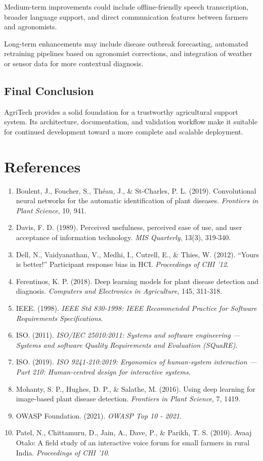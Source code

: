 \documentclass[12pt]{article}
\begin{document}
Medium-term improvements could include offline-friendly speech transcription, broader language support, and direct communication features between farmers and agronomists.

Long-term enhancements may include disease outbreak forecasting, automated retraining pipelines based on agronomist corrections, and integration of weather or sensor data for more contextual diagnosis.

\subsection{Final Conclusion}
AgriTech provides a solid foundation for a trustworthy agricultural support system. Its architecture, documentation, and validation workflow make it suitable for continued development toward a more complete and scalable deployment.

\newpage
\section*{References}

\begin{enumerate}
    \item Boulent, J., Foucher, S., Théau, J., \& St-Charles, P. L. (2019). Convolutional neural networks for the automatic identification of plant diseases. \textit{Frontiers in Plant Science}, 10, 941.
    \item Davis, F. D. (1989). Perceived usefulness, perceived ease of use, and user acceptance of information technology. \textit{MIS Quarterly}, 13(3), 319-340.
    \item Dell, N., Vaidyanathan, V., Medhi, I., Cutrell, E., \& Thies, W. (2012). ``Yours is better!'' Participant response bias in HCI. \textit{Proceedings of CHI '12}.
    \item Ferentinos, K. P. (2018). Deep learning models for plant disease detection and diagnosis. \textit{Computers and Electronics in Agriculture}, 145, 311-318.
    \item IEEE. (1998). \textit{IEEE Std 830-1998: IEEE Recommended Practice for Software Requirements Specifications}.
    \item ISO. (2011). \textit{ISO/IEC 25010:2011: Systems and software engineering --- Systems and software Quality Requirements and Evaluation (SQuaRE)}.
    \item ISO. (2019). \textit{ISO 9241-210:2019: Ergonomics of human-system interaction --- Part 210: Human-centred design for interactive systems}.
    \item Mohanty, S. P., Hughes, D. P., \& Salathe, M. (2016). Using deep learning for image-based plant disease detection. \textit{Frontiers in Plant Science}, 7, 1419.
    \item OWASP Foundation. (2021). \textit{OWASP Top 10 - 2021}.
    \item Patel, N., Chittamuru, D., Jain, A., Dave, P., \& Parikh, T. S. (2010). Avaaj Otalo: A field study of an interactive voice forum for small farmers in rural India. \textit{Proceedings of CHI '10}.
\end{enumerate}
\end{document}
